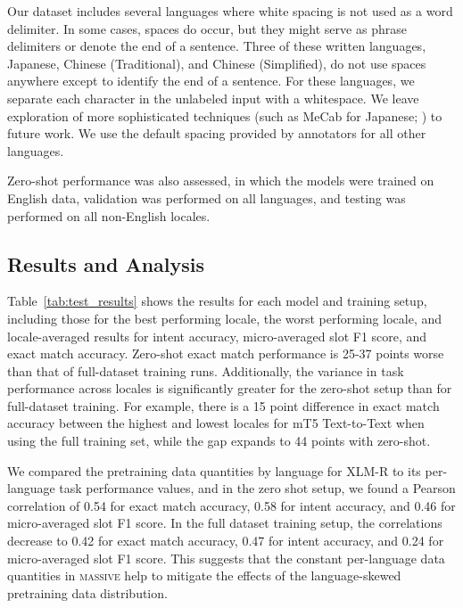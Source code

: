 \documentclass[11pt]{article}
\newcommand{\M}{\textsc{massive}}
\begin{document}
Our dataset includes several languages where white spacing is not used as a word delimiter. In some cases, spaces do occur, but they might serve as phrase delimiters or denote the end of a sentence.
Three of these written languages, Japanese, Chinese (Traditional), and Chinese (Simplified), do not use spaces anywhere except to identify the end of a sentence.
For these languages, we separate each character in the unlabeled input with a whitespace.
We leave exploration of more sophisticated techniques (such as MeCab for Japanese; \citealt{Kudo2005MeCabY}) to future work.
We use the default spacing provided by annotators for all other languages.

Zero-shot performance was also assessed, in which the models were trained on English data, validation was performed on all languages, and testing was performed on all non-English locales.

\subsection{Results and Analysis}

Table~\ref{tab:test_results} shows the results for each model and training setup, including those for the best performing locale, the worst performing locale, and locale-averaged results for intent accuracy, micro-averaged slot F1 score, and exact match accuracy.
Zero-shot exact match performance is 25-37 points worse than that of full-dataset training runs.
Additionally, the variance in task performance across locales is significantly greater for the zero-shot setup than for full-dataset training.
For example, there is a 15 point difference in exact match accuracy between the highest and lowest locales for mT5 Text-to-Text when using the full training set, while the gap expands to 44 points with zero-shot.

We compared the pretraining data quantities by language for XLM-R to its per-language task performance values, and in the zero shot setup, we found a Pearson correlation of 0.54 for exact match accuracy, 0.58 for intent accuracy, and 0.46 for micro-averaged slot F1 score. In the full dataset training setup, the correlations decrease to 0.42 for exact match accuracy, 0.47 for intent accuracy, and 0.24 for micro-averaged slot F1 score. This suggests that the constant per-language data quantities in \M{} help to mitigate the effects of the language-skewed pretraining data distribution.
\end{document}
